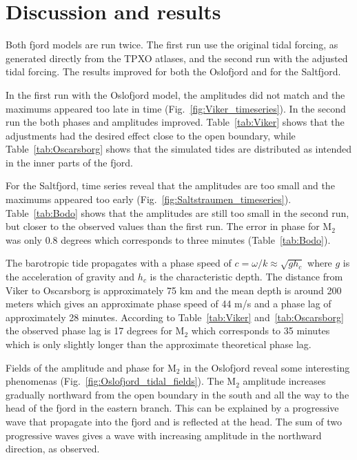 \section{Discussion and results}

Both fjord models are run twice. The first run use the original tidal forcing, as generated directly from the TPXO atlases, and the second run with the adjusted tidal forcing. The results improved for both the Oslofjord and for the Saltfjord. 

In the first run with the Oslofjord model, the amplitudes did not match and the maximums appeared too late in time (Fig.~\ref{fig:Viker_timeseries}). In the second run the both phases and amplitudes improved. Table~\ref{tab:Viker} shows that the adjustments had the desired effect close to the open boundary, while Table~\ref{tab:Oscarsborg} shows that the simulated tides are distributed as intended in the inner parts of the fjord. 

For the Saltfjord, time series reveal that the amplitudes are too small and the maximums appeared too early (Fig.~\ref{fig:Saltstraumen_timeseries}). Table~\ref{tab:Bodo} shows that the amplitudes are still too small in the second run, but closer to the observed values than the first run. The error in phase for M$_2$ was only $0.8$ degrees which corresponds to three minutes (Table~\ref{tab:Bodo}).

The barotropic tide propagates with a phase speed of $c = \omega/k \approx \sqrt{g h_c}$ where $g$ is the acceleration of gravity and $h_c$ is the characteristic depth. The distance from Viker to Oscarsborg is approximately 75 km and the mean depth is around 200 meters which gives an approximate phase speed of 44 m/s and a phase lag of approximately 28 minutes. According to Table~\ref{tab:Viker} and~\ref{tab:Oscarsborg} the observed phase lag is 17 degrees for M$_2$ which corresponds to 35 minutes which is only slightly longer than the approximate theoretical phase lag. 

Fields of the amplitude and phase for M$_2$ in the Oslofjord reveal some interesting phenomenas (Fig.~\ref{fig:Oslofjord_tidal_fields}). 
The M$_2$ amplitude increases gradually northward from the open boundary in the south and all the way to the head of the fjord in the eastern branch. 
This can be explained by a progressive wave that propagate into the fjord and is reflected at the head.
The sum of two progressive waves gives a wave with increasing amplitude in the northward direction, as observed. 

